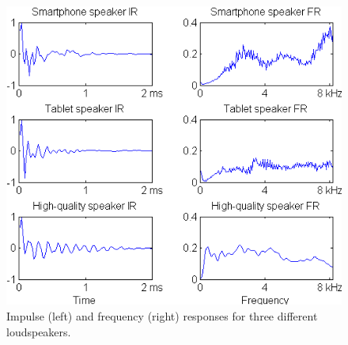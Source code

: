 
\begin{figure}
	\centering
	\includegraphics[width=1\linewidth]{Figs/IRs.png}
	\caption{Impulse (left) and frequency (right) responses for three different loudspeakers.}
	\label{fig::IRs}
\end{figure}

